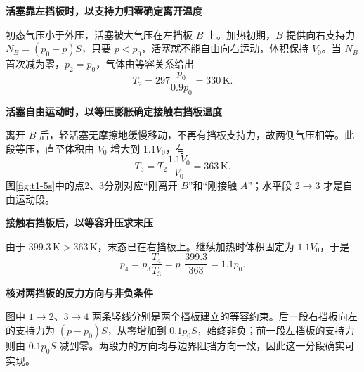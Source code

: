 \begin{solution}\textbf{活塞靠左挡板时，以支持力归零确定离开温度}\par\nobreak
初态气压小于外压，活塞被大气压在左挡板 $B$ 上。加热初期，$B$ 提供向右支持力 $N_B=(p_0-p)S$，只要 $p<p_0$，活塞就不能自由向右运动，体积保持 $V_0$。当 $N_B$ 首次减为零，$p_2=p_0$，气体由等容关系给出
\[\boxed{T_2=297\frac{p_0}{0.9p_0}=330\,\mathrm K}.\]


\par\medskip{}\noindent\textbf{活塞自由运动时，以等压膨胀确定接触右挡板温度}\par\nobreak
离开 $B$ 后，轻活塞无摩擦地缓慢移动，不再有挡板支持力，故两侧气压相等。此段等压，直至体积由 $V_0$ 增大到 $1.1V_0$，有
\[\boxed{T_3=T_2\frac{1.1V_0}{V_0}=363\,\mathrm K}.\]
图\ref{fig:t1-5s}中的点2、3分别对应“刚离开 $B$”和“刚接触 $A$”；水平段 $2\to3$ 才是自由运动段。



\par\medskip{}\noindent\textbf{接触右挡板后，以等容升压求末压}\par\nobreak
由于 $399.3\,\mathrm K>363\,\mathrm K$，末态已在右挡板上。继续加热时体积固定为 $1.1V_0$，于是
\[\boxed{p_4=p_3\frac{T_4}{T_3}=p_0\frac{399.3}{363}=1.1p_0}.\]


\par\medskip{}\noindent\textbf{核对两挡板的反力方向与非负条件}\par\nobreak
图中 $1\to2$、$3\to4$ 两条竖线分别是两个挡板建立的等容约束。后一段右挡板向左的支持力为 $(p-p_0)S$，从零增加到 $0.1p_0S$，始终非负；前一段左挡板的支持力则由 $0.1p_0S$ 减到零。两段力的方向均与边界阻挡方向一致，因此这一分段确实可实现。
\end{solution}
